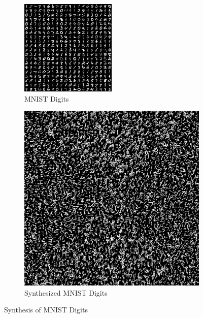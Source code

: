 \documentclass{article}
\begin{document}
\begin{figure}[htbp!]
    \centering
    \begin{subfigure}[b]{0.49\textwidth}
        \centering
        \includegraphics[width=0.5\textwidth]{../Code/Textures/mnist.png}
        \caption{MNIST Digits}
        \label{fig:original-mnist}
    \end{subfigure}
    \hfill %
    \begin{subfigure}[b]{0.49\textwidth}
        \centering
        \includegraphics[width=\textwidth]{../Result/mnist-patch-11.png}
        \caption{Synthesized MNIST Digits}
        \label{fig:synthesized-mnist}
    \end{subfigure}
    \caption{Synthesis of MNIST Digits}
    \label{fig:synthesis-mnist}
\end{figure}
\end{document}
